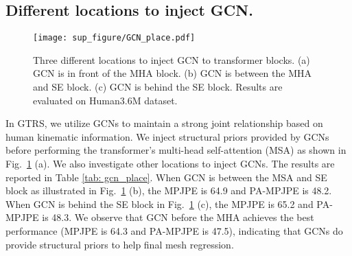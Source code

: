 \documentclass[sigconf]{acmart}
\begin{document}
\subsection{Different locations to inject GCN. }

\begin{figure}[htp]
\vspace{-5pt}
  \centering
  \texttt{[image: sup\_figure/GCN\_place.pdf]}
  \vspace{-5pt}
  \caption{Three different locations to inject GCN to transformer blocks. (a) GCN is in front of the MHA block. (b) GCN is between the MHA and SE block. (c) GCN is behind the SE block. Results are evaluated on Human3.6M dataset. }
  \label{fig:gcn_place}
  \vspace{-5pt}
\end{figure}


In GTRS, we utilize GCNs to maintain a strong joint relationship based on human kinematic information. We inject structural priors provided by GCNs before performing the transformer's multi-head self-attention (MSA) as shown in Fig.~\ref{fig:gcn_place} (a). We also investigate other locations to inject GCNs. The results are reported in Table \ref{tab: gcn_place}. When GCN is between the MSA and SE block as illustrated in Fig.~\ref{fig:gcn_place} (b), the MPJPE is 64.9 and PA-MPJPE is 48.2. When GCN is behind the SE block in Fig.~\ref{fig:gcn_place} (c), the MPJPE is 65.2 and PA-MPJPE is 48.3. We observe that GCN before the MHA achieves the best performance (MPJPE is 64.3 and PA-MPJPE is 47.5), indicating that GCNs do provide structural priors to help final mesh regression. 

\begin{table}[htp]
\tiny
\centering
  \caption{ Ablation study on different locations to inject GCN. Results are evaluated on Human3.6M dataset.}
\label{tab: gcn_place}
\vspace{-15pt}
\end{table}
\end{document}

